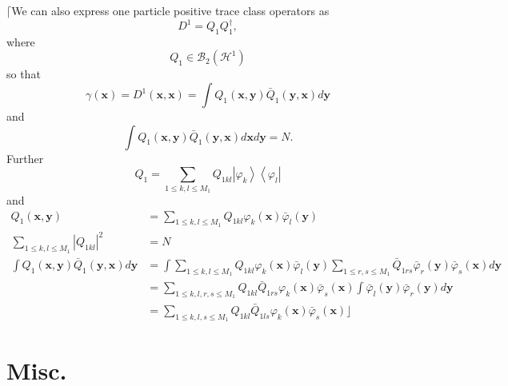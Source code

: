 \documentclass[aps,preprint]{revtex4}%
\begin{document}
$\lceil$We can also express one particle positive trace class operators as
\begin{equation}
D^{1}=Q_{1}Q_{1}^{\dagger},
\end{equation}
where
\begin{equation}
Q_{1}\in\mathcal{B}_{2}\left(  \mathcal{H}^{1}\right)
\end{equation}
so that
\begin{equation}
\gamma\left(  \mathbf{x}\right)  =D^{1}\left(  \mathbf{x,x}\right)  =\int
Q_{1}\left(  \mathbf{x,y}\right)  \bar{Q}_{1}\left(  \mathbf{y,x}\right)
d\mathbf{y}%
\end{equation}
and
\begin{equation}
\int Q_{1}\left(  \mathbf{x,y}\right)  \bar{Q}_{1}\left(  \mathbf{y,x}\right)
d\mathbf{x}d\mathbf{y}=N\mathbf{.}%
\end{equation}
Further
\begin{equation}
Q_{1}=\sum_{1\leq k,l\leq M_{1}}Q_{1kl}\left\vert \varphi_{k}\right\rangle
\left\langle \varphi_{l}\right\vert
\end{equation}
and
\begin{align}
Q_{1}\left(  \mathbf{x,y}\right)   &  =\sum_{1\leq k,l\leq M_{1}}%
Q_{1kl}\varphi_{k}\left(  \mathbf{x}\right)  \bar{\varphi}_{l}\left(
\mathbf{y}\right) \\
\sum_{1\leq k,l\leq M_{1}}\left\vert Q_{1kl}\right\vert ^{2}  &  =N\nonumber\\
\int Q_{1}\left(  \mathbf{x,y}\right)  \bar{Q}_{1}\left(  \mathbf{y,x}\right)
d\mathbf{y}  &  \mathbf{=}\int\sum_{1\leq k,l\leq M_{1}}Q_{1kl}\varphi
_{k}\left(  \mathbf{x}\right)  \bar{\varphi}_{l}\left(  \mathbf{y}\right)
\sum_{1\leq r,s\leq M_{1}}\bar{Q}_{1rs}\bar{\varphi}_{r}\left(  \mathbf{y}%
\right)  \bar{\varphi}_{s}\left(  \mathbf{x}\right)  d\mathbf{y}\\
&  =\sum_{1\leq k,l,r,s\leq M_{1}}Q_{1kl}\bar{Q}_{1rs}\varphi_{k}\left(
\mathbf{x}\right)  \bar{\varphi}_{s}\left(  \mathbf{x}\right)  \int%
\bar{\varphi}_{l}\left(  \mathbf{y}\right)  \bar{\varphi}_{r}\left(
\mathbf{y}\right)  d\mathbf{y}\\
&  =\sum_{1\leq k,l,s\leq M_{1}}Q_{1kl}\bar{Q}_{1ls}\varphi_{k}\left(
\mathbf{x}\right)  \bar{\varphi}_{s}\left(  \mathbf{x}\right)  \rfloor
\end{align}


\section{Misc.}
\end{document}
